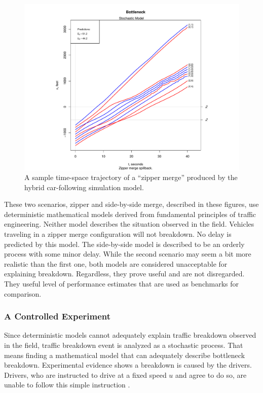 \documentclass[Proceedings]{ascelike}
\begin{document}
\begin{figure}
\centering
\includegraphics[width = 7in]{Rplot09.pdf}
\caption{A sample time-space trajectory of a ``zipper merge'' produced by the hybrid car-following simulation model.}
\label{stochmodel}
\end{figure}

These two scenarios, zipper and side-by-side merge, described in these figures, use deterministic mathematical models derived from fundamental principles of traffic engineering. Neither model describes the situation observed in the field.  Vehicles traveling in a zipper merge configuration will not breakdown. No delay is predicted by this model.    The side-by-side model is described to be  an orderly process with some minor delay. While the second scenario may seem a bit more realistic than the first one, both models are considered unacceptable for explaining breakdown. Regardless, they prove useful and are not disregarded. They useful level of performance estimates that are used as benchmarks for comparison.


\subsubsection{A Controlled Experiment}

Since deterministic models cannot  adequately explain traffic breakdown observed in the field,  traffic breakdown event is analyzed as a stochastic process.   That means finding a  mathematical model that can adequately describe bottleneck breakdown. Experimental evidence shows  a breakdown is caused by  the drivers. Drivers, who are instructed to drive at a fixed speed $u$ and agree to do so, are unable to follow this simple instruction \cite{1367-2630-10-3-033001}. 
\end{document}
